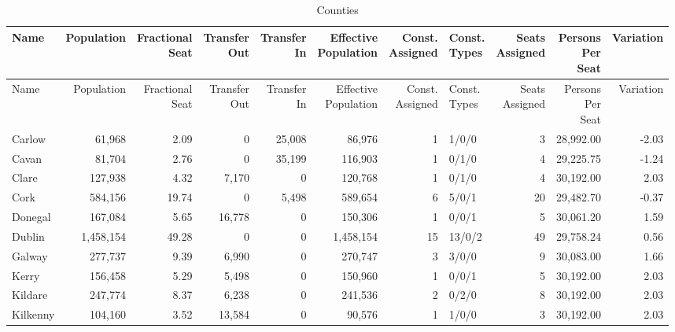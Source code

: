 \documentclass[a4paper]{article}
\begin{document}
\begin{longtable}{lrrrrrrlrrr}
\caption{Counties}
\\ \toprule
Name &Population &\shortstack{Fractional\\Seat} &\shortstack{Transfer\\Out} &\shortstack{Transfer\\In} &\shortstack{Effective\\Population} &\shortstack{Const.\\Assigned} &\shortstack{Const.\\Types} &\shortstack{Seats\\Assigned} &\shortstack{Persons\\Per\\Seat} &Variation \\ \midrule
\endfirsthead
\toprule
Name &Population &\shortstack{Fractional\\Seat} &\shortstack{Transfer\\Out} &\shortstack{Transfer\\In} &\shortstack{Effective\\Population} &\shortstack{Const.\\Assigned} &\shortstack{Const.\\Types} &\shortstack{Seats\\Assigned} &\shortstack{Persons\\Per\\Seat} &Variation \\ \midrule
\endhead
\bottomrule
\endfoot
Carlow&61,968& 2.09&0&25,008&86,976&1&1/0/0&3&28,992.00&-2.03\\ 
Cavan&81,704& 2.76&0&35,199&116,903&1&0/1/0&4&29,225.75&-1.24\\ 
Clare&127,938& 4.32&7,170&0&120,768&1&0/1/0&4&30,192.00& 2.03\\ 
Cork&584,156&19.74&0&5,498&589,654&6&5/0/1&20&29,482.70&-0.37\\ 
Donegal&167,084& 5.65&16,778&0&150,306&1&0/0/1&5&30,061.20& 1.59\\ 
Dublin&1,458,154&49.28&0&0&1,458,154&15&13/0/2&49&29,758.24& 0.56\\ 
Galway&277,737& 9.39&6,990&0&270,747&3&3/0/0&9&30,083.00& 1.66\\ 
Kerry&156,458& 5.29&5,498&0&150,960&1&0/0/1&5&30,192.00& 2.03\\ 
Kildare&247,774& 8.37&6,238&0&241,536&2&0/2/0&8&30,192.00& 2.03\\ 
Kilkenny&104,160& 3.52&13,584&0&90,576&1&1/0/0&3&30,192.00& 2.03\\ 

\end{longtable}
\end{document}
